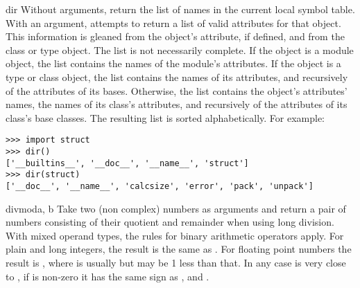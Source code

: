 \begin{funcdesc}{dir}{}
  Without arguments, return the list of names in the current local
  symbol table.  With an argument, attempts to return a list of valid
  attributes for that object.  This information is gleaned from the
  object's  attribute, if defined, and from the class
  or type object.  The list is not necessarily complete.
  If the object is a module object, the list contains the names of the
  module's attributes.
  If the object is a type or class object,
  the list contains the names of its attributes,
  and recursively of the attributes of its bases.
  Otherwise, the list contains the object's attributes' names,
  the names of its class's attributes,
  and recursively of the attributes of its class's base classes.
  The resulting list is sorted alphabetically.
  For example:

\begin{verbatim}
>>> import struct
>>> dir()
['__builtins__', '__doc__', '__name__', 'struct']
>>> dir(struct)
['__doc__', '__name__', 'calcsize', 'error', 'pack', 'unpack']
\end{verbatim}

\end{funcdesc}

\begin{funcdesc}{divmod}{a, b}
  Take two (non complex) numbers as arguments and return a pair of numbers
  consisting of their quotient and remainder when using long division.  With
  mixed operand types, the rules for binary arithmetic operators apply.  For
  plain and long integers, the result is the same as
  .
  For floating point numbers the result is , where  is usually  but may be 1 less than that.  In any case  is very close to , if
   is non-zero it has the same sign as
  , and .

\end{funcdesc}

